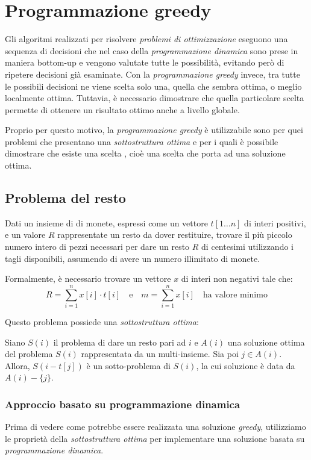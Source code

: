 \chapter{Programmazione greedy}
Gli algoritmi realizzati per risolvere \emph{problemi di ottimizzazione}
eseguono una sequenza di decisioni che nel caso della \emph{programmazione
dinamica} sono prese in maniera bottom-up e vengono valutate tutte le possibilità,
evitando però di ripetere decisioni già esaminate. Con la \emph{programmazione
greedy} invece, tra tutte le possibili decisioni ne viene scelta solo una,
quella che sembra ottima, o meglio localmente ottima. Tuttavia, è necessario
dimostrare che quella particolare scelta permette di ottenere un risultato
ottimo anche a livello globale.

Proprio per questo motivo, la \emph{programmazione greedy} è utilizzabile sono
per quei problemi che presentano una \emph{sottostruttura ottima} e per i
quali è possibile dimostrare che esiste una scelta , cioè una scelta
che porta ad una soluzione ottima.

\section{Problema del resto}
\begin{problem}
    Dati un insieme di  di monete, espressi come un vettore $t[1\dots n]$
    di interi positivi, e un valore $R$ rappresentate un resto da dover restituire,
    trovare il più piccolo numero intero di pezzi necessari per dare un resto
    $R$ di centesimi utilizzando i tagli disponibili, assumendo di avere un
    numero illimitato di monete.

    Formalmente, è necessario trovare un vettore $x$ di interi non negativi
    tale che:
    \[R=\sum_{i=1}^n x[i]\cdot t[i]\quad\text{e}\quad m=\sum_{i=1}^n x[i]\quad
    \text{ha valore minimo}\]
\end{problem}

\noindent
Questo problema possiede una \emph{sottostruttura ottima}:
\begin{definition}
    Siano $S(i)$ il problema di dare un resto pari ad $i$ e $A(i)$ una soluzione
    ottima del problema $S(i)$ rappresentata da un multi-insieme. Sia poi
    $j\in A(i)$. Allora, $S(i-t[j])$ è un sotto-problema di $S(i)$, la cui
    soluzione è data da $A(i)-\{j\}$.
\end{definition}

\subsection{Approccio basato su programmazione dinamica}
Prima di vedere come potrebbe essere realizzata una soluzione \emph{greedy},
utilizziamo le proprietà della \emph{sottostruttura ottima} per implementare
una soluzione basata su \emph{programmazione dinamica}.

